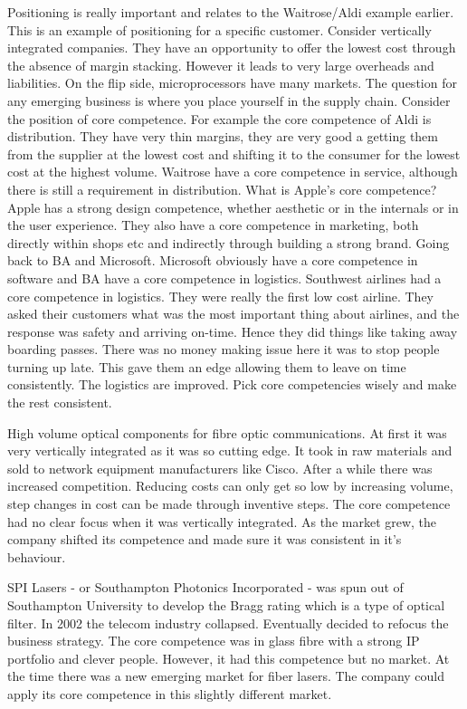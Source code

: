 Positioning is really important and relates to the Waitrose/Aldi example earlier. This is an example of positioning for a specific customer. Consider vertically integrated companies. They have an opportunity to offer the lowest cost through the absence of margin stacking. However it leads to very large overheads and liabilities. On the flip side, microprocessors have many markets. The question for any emerging business is where you place yourself in the supply chain. Consider the position of core competence. For example the core competence of Aldi is distribution. They have very thin margins, they are very good a getting them from the supplier at the lowest cost and shifting it to the consumer for the lowest cost at the highest volume. Waitrose have a core competence in service, although there is still a requirement in distribution. What is Apple's core competence? Apple has a strong design competence, whether aesthetic or in the internals or in the user experience. They also have a core competence in marketing, both directly within shops etc and indirectly through building a strong brand. Going back to BA and Microsoft. Microsoft obviously have a core competence in software and BA have a core competence in logistics. Southwest airlines had a core competence in logistics. They were really the first low cost airline. They asked their customers what was the most important thing about airlines, and the response was safety and arriving on-time. Hence they did things like taking away boarding passes. There was no money making issue here it was to stop people turning up late. This gave them an edge allowing them to leave on time consistently. The logistics are improved. Pick core competencies wisely and make the rest consistent.

High volume optical components for fibre optic communications. At first it was very vertically integrated as it was so cutting edge. It took in raw materials and sold to network equipment manufacturers like Cisco. After a while there was increased competition. Reducing costs can only get so low by increasing volume, step changes in cost can be made through inventive steps. The core competence had no clear focus when it was vertically integrated. As the market grew, the company shifted its competence and made sure it was consistent in it's behaviour. 

SPI Lasers - or Southampton Photonics Incorporated - was spun out of Southampton University to develop the Bragg rating which is a type of optical filter. In 2002 the telecom industry collapsed. Eventually decided to refocus the business strategy. The core competence was in glass fibre with a strong IP portfolio and clever people. However, it had this competence but no market. At the time there was a new emerging market for fiber lasers. The company could apply its core competence in this slightly different market.

